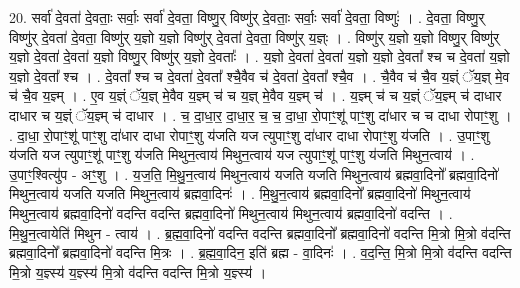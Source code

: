 \documentclass[17pt]{extarticle}
\begin{document}
20. सर्वा॑ दे॒वता॑ दे॒वताः॒ सर्वाः॒ सर्वा॑ दे॒वता॒ विष्णु॒र् विष्णु॑र् दे॒वताः॒ सर्वाः॒ सर्वा॑ दे॒वता॒ विष्णुः॑ । . दे॒वता॒ विष्णु॒र् विष्णु॑र् दे॒वता॑ दे॒वता॒ विष्णु॑र् य॒ज्ञो य॒ज्ञो विष्णु॑र् दे॒वता॑ दे॒वता॒ विष्णु॑र् य॒ज्ञ्ः । . विष्णु॑र् य॒ज्ञो य॒ज्ञो विष्णु॒र् विष्णु॑र् य॒ज्ञो दे॒वता॑ दे॒वता॑ य॒ज्ञो विष्णु॒र् विष्णु॑र् य॒ज्ञो दे॒वताः᳚ । . य॒ज्ञो दे॒वता॑ दे॒वता॑ य॒ज्ञो य॒ज्ञो दे॒वता᳚ श्च च दे॒वता॑ य॒ज्ञो य॒ज्ञो दे॒वता᳚ श्च । . दे॒वता᳚ श्च च दे॒वता॑ दे॒वता᳚ श्चै॒वैव च॑ दे॒वता॑ दे॒वता᳚ श्चै॒व । . चै॒वैव च॑ चै॒व य॒ज्ञ्ं ॅय॒ज्ञ् मे॒व च॑ चै॒व य॒ज्ञ्म् । . ए॒व य॒ज्ञ्ं ॅय॒ज्ञ् मे॒वैव य॒ज्ञ्म् च॑ च य॒ज्ञ् मे॒वैव य॒ज्ञ्म् च॑ । . य॒ज्ञ्म् च॑ च य॒ज्ञ्ं ॅय॒ज्ञ्म् च॑ दाधार दाधार च य॒ज्ञ्ं ॅय॒ज्ञ्म् च॑ दाधार । . च॒ दा॒धा॒र॒ दा॒धा॒र॒ च॒ च॒ दा॒धा॒ रो॒पाꣳ॒॒शू॑ पाꣳ॒॒शु दा॑धार च च दाधा रोपाꣳ॒॒शु । . दा॒धा॒ रो॒पाꣳ॒॒शू॑ पाꣳ॒॒शु दा॑धार दाधा रोपाꣳ॒॒शु य॑जति यज त्युपाꣳ॒॒शु दा॑धार दाधा रोपाꣳ॒॒शु य॑जति । . उ॒पाꣳ॒॒शु य॑जति यज त्युपाꣳ॒॒शू॑ पाꣳ॒॒शु य॑जति मिथुन॒त्वाय॑ मिथुन॒त्वाय॑ यज त्युपाꣳ॒॒शू॑ पाꣳ॒॒शु य॑जति मिथुन॒त्वाय॑ । . उ॒पाꣳ॒॒श्वित्यु॑प - अꣳ॒॒शु । . य॒ज॒ति॒ मि॒थु॒न॒त्वाय॑ मिथुन॒त्वाय॑ यजति यजति मिथुन॒त्वाय॑ ब्रह्मवा॒दिनो᳚ ब्रह्मवा॒दिनो॑ मिथुन॒त्वाय॑ यजति यजति मिथुन॒त्वाय॑ ब्रह्मवा॒दिनः॑ । . मि॒थु॒न॒त्वाय॑ ब्रह्मवा॒दिनो᳚ ब्रह्मवा॒दिनो॑ मिथुन॒त्वाय॑ मिथुन॒त्वाय॑ ब्रह्मवा॒दिनो॑ वदन्ति वदन्ति ब्रह्मवा॒दिनो॑ मिथुन॒त्वाय॑ मिथुन॒त्वाय॑ ब्रह्मवा॒दिनो॑ वदन्ति । . मि॒थु॒न॒त्वायेति॑ मिथुन - त्वाय॑ । . ब्र॒ह्म॒वा॒दिनो॑ वदन्ति वदन्ति ब्रह्मवा॒दिनो᳚ ब्रह्मवा॒दिनो॑ वदन्ति मि॒त्रो मि॒त्रो व॑दन्ति ब्रह्मवा॒दिनो᳚ ब्रह्मवा॒दिनो॑ वदन्ति मि॒त्रः । . ब्र॒ह्म॒वा॒दिन॒ इति॑ ब्रह्म - वा॒दिनः॑ । . व॒द॒न्ति॒ मि॒त्रो मि॒त्रो व॑दन्ति वदन्ति मि॒त्रो य॒ज्ञ्स्य॑ य॒ज्ञ्स्य॑ मि॒त्रो व॑दन्ति वदन्ति मि॒त्रो य॒ज्ञ्स्य॑ । \newline
\end{document}
